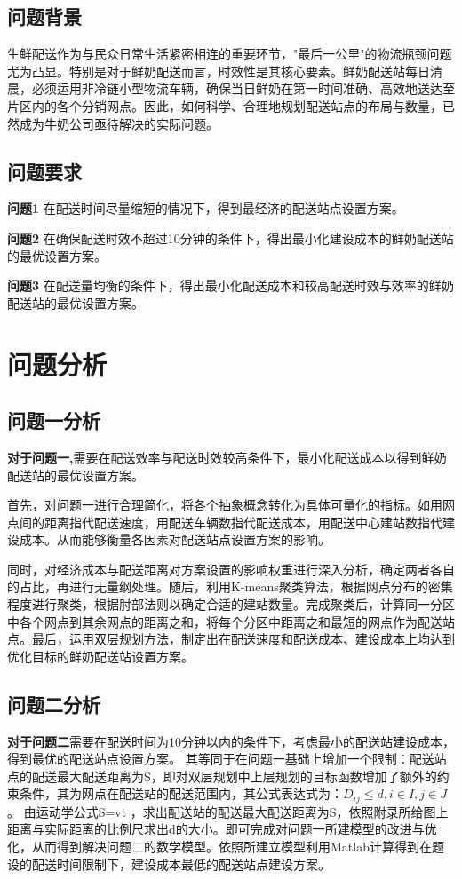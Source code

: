\documentclass[withoutpreface,bwprint]{cumcmthesis} %
\begin{document}
	\subsection{问题背景}
生鲜配送作为与民众日常生活紧密相连的重要环节，"最后一公里"的物流瓶颈问题尤为凸显。特别是对于鲜奶配送而言，时效性是其核心要素。鲜奶配送站每日清晨，必须运用非冷链小型物流车辆，确保当日鲜奶在第一时间准确、高效地送达至片区内的各个分销网点。因此，如何科学、合理地规划配送站点的布局与数量，已然成为牛奶公司亟待解决的实际问题。
	\subsection{问题要求}
	
	\textbf{问题1}  在配送时间尽量缩短的情况下，得到最经济的配送站点设置方案。
	
	\textbf{问题2}  在确保配送时效不超过10分钟的条件下，得出最小化建设成本的鲜奶配送站的最优设置方案。
	
	\textbf{问题3} 在配送量均衡的条件下，得出最小化配送成本和较高配送时效与效率的鲜奶配送站的最优设置方案。
	
	
	\section{问题分析}
	\subsection{问题一分析}
	\textbf{对于问题一,}需要在配送效率与配送时效较高条件下，最小化配送成本以得到鲜奶配送站的最优设置方案。
	
	首先，对问题一进行合理简化，将各个抽象概念转化为具体可量化的指标。如用网点间的距离指代配送速度，用配送车辆数指代配送成本，用配送中心建站数指代建设成本。从而能够衡量各因素对配送站点设置方案的影响。
	
	同时，对经济成本与配送距离对方案设置的影响权重进行深入分析，确定两者各自的占比，再进行无量纲处理。随后，利用K-means聚类算法，根据网点分布的密集程度进行聚类，根据肘部法则以确定合适的建站数量。完成聚类后，计算同一分区中各个网点到其余网点的距离之和，将每个分区中距离之和最短的网点作为配送站点。最后，运用双层规划方法，制定出在配送速度和配送成本、建设成本上均达到优化目标的鲜奶配送站设置方案。
	
	\subsection{问题二分析}	
	\textbf{对于问题二}需要在配送时间为10分钟以内的条件下，考虑最小的配送站建设成本，得到最优的配送站点设置方案。
	其等同于在问题一基础上增加一个限制：配送站点的配送最大配送距离为S，即对双层规划中上层规划的目标函数增加了额外的约束条件，其为网点在配送站的配送范围内，其公式表达式为：$D_{ij}\le d,i\in I,j\in J$。 由运动学公式S=vt ，求出配送站的配送最大配送距离为S，依照附录所给图上距离与实际距离的比例尺求出d的大小。即可完成对问题一所建模型的改进与优化，从而得到解决问题二的数学模型。依照所建立模型利用Matlab计算得到在题设的配送时间限制下，建设成本最低的配送站点建设方案。
	
\end{document}
